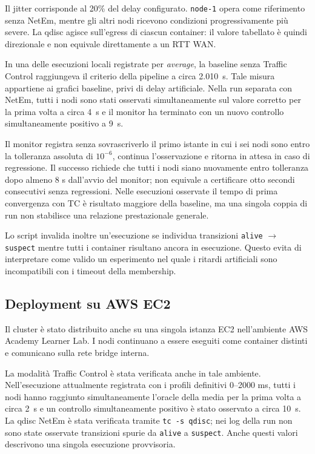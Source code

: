\documentclass[conference]{IEEEtran}
\newcommand{\AvgConvTime}{2.010}
\newcommand{\TCLocalFirstConv}{4}
\newcommand{\TCLocalStable}{9}
\newcommand{\TCAWSFirstConv}{2}
\newcommand{\TCAWSStable}{10}
\begin{document}
Il jitter corrisponde al 20\% del delay configurato. \texttt{node-1} opera come riferimento senza NetEm, mentre gli altri nodi ricevono condizioni progressivamente più severe. La qdisc agisce sull'egress di ciascun container: il valore tabellato è quindi direzionale e non equivale direttamente a un RTT WAN.

In una delle esecuzioni locali registrate per \emph{average}, la baseline senza Traffic Control raggiungeva il criterio della pipeline a circa \AvgConvTime~s. Tale misura appartiene ai grafici baseline, privi di delay artificiale. Nella run separata con NetEm, tutti i nodi sono stati osservati simultaneamente sul valore corretto per la prima volta a circa \TCLocalFirstConv~s e il monitor ha terminato con un nuovo controllo simultaneamente positivo a \TCLocalStable~s.

Il monitor registra senza sovrascriverlo il primo istante in cui i sei nodi sono entro la tolleranza assoluta di $10^{-6}$, continua l'osservazione e ritorna in attesa in caso di regressione. Il successo richiede che tutti i nodi siano nuovamente entro tolleranza dopo almeno 8 s dall'avvio del monitor; non equivale a certificare otto secondi consecutivi senza regressioni. Nelle esecuzioni osservate il tempo di prima convergenza con TC è risultato maggiore della baseline, ma una singola coppia di run non stabilisce una relazione prestazionale generale.

Lo script invalida inoltre un'esecuzione se individua transizioni \texttt{alive} $\rightarrow$ \texttt{suspect} mentre tutti i container risultano ancora in esecuzione. Questo evita di interpretare come valido un esperimento nel quale i ritardi artificiali sono incompatibili con i timeout della membership.

\subsection{Deployment su AWS EC2}

Il cluster è stato distribuito anche su una singola istanza EC2 nell'ambiente AWS Academy Learner Lab. I nodi continuano a essere eseguiti come container distinti e comunicano sulla rete bridge interna.

La modalità Traffic Control è stata verificata anche in tale ambiente. Nell'esecuzione attualmente registrata con i profili definitivi 0--2000 ms, tutti i nodi hanno raggiunto simultaneamente l'oracle della media per la prima volta a circa \TCAWSFirstConv~s e un controllo simultaneamente positivo è stato osservato a circa \TCAWSStable~s. La qdisc NetEm è stata verificata tramite \texttt{tc -s qdisc}; nei log della run non sono state osservate transizioni spurie da \texttt{alive} a \texttt{suspect}. Anche questi valori descrivono una singola esecuzione provvisoria.
\end{document}
